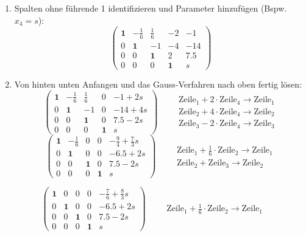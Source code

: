 \documentclass[11pt, openany]{book}
\begin{document}
\begin{enumerate}
    \item Spalten ohne führende 1 identifizieren und Parameter hinzufügen (Bspw. $x_4 = s$):
    {\small
    \[
    \left(
    \begin{array}{cccc|c}
      \textbf{1} & -\frac{1}{6} & \frac{1}{6} & -2 & -1 \\
      0 & \textbf{1} & -1 & -4 & -14 \\
      0 & 0 & \textbf{1} & 2 & 7.5 \\
      0 & 0 & 0 & \textbf{1} & s
    \end{array}
    \right)
    \]}
    \item Von hinten unten Anfangen und das Gauss-Verfahren nach oben fertig lösen:
    {\small
    \[
    \left(
    \begin{array}{cccc|c}
      \textbf{1} & -\frac{1}{6} & \frac{1}{6} & 0 & -1 + 2s \\
      0 & \textbf{1} & -1 & 0 & -14 + 4s \\
      0 & 0 & \textbf{1} & 0 & 7.5 - 2s \\
      0 & 0 & 0 & \textbf{1} & s
    \end{array}
    \right) \qquad \begin{array}{c}
      \text{Zeile}_1 + 2\cdot\text{Zeile}_4 \to \text{Zeile}_1 \\
      \text{Zeile}_2 + 4\cdot\text{Zeile}_4 \to \text{Zeile}_2 \\
      \text{Zeile}_3 - 2\cdot\text{Zeile}_4 \to \text{Zeile}_3
    \end{array}
    \]
    \[
    \left(
    \begin{array}{cccc|c}
      \textbf{1} & -\frac{1}{6} & 0 & 0 & -\frac{9}{4} + \frac{7}{3}s \\
      0 & \textbf{1} & 0 & 0 & -6.5 + 2s \\
      0 & 0 & \textbf{1} & 0 & 7.5 - 2s \\
      0 & 0 & 0 & \textbf{1} & s
    \end{array}
    \right) \qquad \begin{array}{c}
      \text{Zeile}_1 + \frac{1}{6}\cdot\text{Zeile}_2 \to \text{Zeile}_1 \\
      \text{Zeile}_2 + \text{Zeile}_3 \to \text{Zeile}_2
    \end{array}
    \]}
\end{enumerate}

{\small
\[
\left(
\begin{array}{cccc|c}
      \textbf{1} & 0 & 0 & 0 & -\frac{7}{6} + \frac{8}{3}s \\
      0 & \textbf{1} & 0 & 0 & -6.5 + 2s \\
      0 & 0 & \textbf{1} & 0 & 7.5 - 2s \\
      0 & 0 & 0 & \textbf{1} & s
\end{array}
\right) \qquad \begin{array}{c}
    \text{Zeile}_1 + \frac{1}{6}\cdot\text{Zeile}_2 \to \text{Zeile}_1
    \end{array}
\]}
\vspace{1cm}
\end{document}

